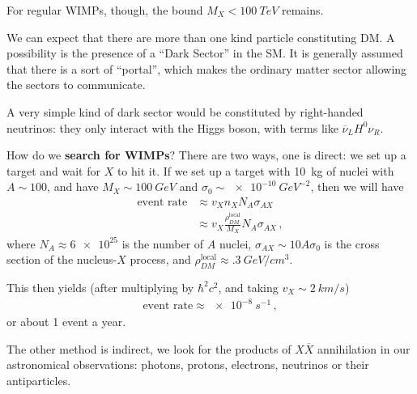 \documentclass[main.tex]{subfiles}
\begin{document}
For regular WIMPs, though, the bound \(M_X < \SI{100}{TeV}\) remains. 

We can expect that there are more than one kind particle constituting DM.
A possibility is the presence of a ``Dark Sector'' in the SM. 
It is generally assumed that there is a sort of ``portal'', which makes the ordinary matter sector allowing the sectors to communicate.

A very simple kind of dark sector would be constituted by right-handed neutrinos: they only interact with the Higgs boson, with terms like \(\overline{\nu}_{L} H^{0} \nu_{R}\).

How do we \textbf{search for WIMPs}? There are two ways, one is direct: we set up a target and wait for \(X\) to hit it. 
If we set up a target with \SI{10}{kg} of nuclei with \(A \sim 100\), and have \(M_X \sim \SI{100}{GeV}\) and \(\sigma_0 \sim \SI{e-10}{GeV^{-2}}\), then we will have 
%
\begin{align}
\text{event rate} &\approx 
v_X n_X N_A \sigma_{AX}  \\
&\approx v_X \frac{\rho_{DM}^{\text{local}}}{M_X} N_A \sigma_{AX}
\,,
\end{align}
%
where \(N_A \approx \num{6e25}\) is the number of \(A\) nuclei, \(\sigma_{AX} \sim 10 A \sigma_0 \) is the cross section of the nucleus-\(X\) process, and \(\rho_{DM}^{\text{local}} \approx \SI{.3}{GeV / cm^3}\).

This then yields (after multiplying by \(\hbar^2 c^2\), and taking \(v_X \sim  \SI{2}{km/s}\)) 
%
\begin{align}
\text{event rate} \approx \SI{e-8}{s^{-1}}
\,,
\end{align}
%
or about 1 event a year.
    
The other method is indirect, we look for the products of \(X \overline{X}\) annihilation in our astronomical observations: photons, protons, electrons, neutrinos or their antiparticles.
\end{document}
